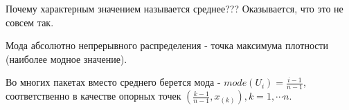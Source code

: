\documentclass[a4 paper]{article}
\begin{document}
Почему характерным значением называется среднее??? Оказывается, что это не совсем так.

\begin{defin}
Мода абсолютно непрерывного распределения - точка максимума плотности (наиболее модное значение).
\end{defin}

Во многих пакетах вместо среднего берется мода - $mode(U_i) = \frac{i-1}{n-1}$, соответственно в качестве опорных точек $(\frac{k - 1}{n-1}, x_{(k)}), k = 1, \cdots n$.
\end{document}
